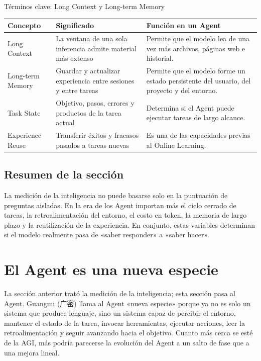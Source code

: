 \documentclass[a4paper]{article}
\begin{document}
\begin{knowledgebox}{Términos clave: Long Context y Long-term Memory}
\noindent\begin{tabularx}{\textwidth}{p{}p{}X}
\toprule
Concepto & Significado & Función en un Agent \\
\midrule
Long Context & La ventana de una sola inferencia admite material más extenso & Permite que el modelo lea de una vez más archivos, páginas web e historial. \\
Long-term Memory & Guardar y actualizar experiencia entre sesiones y entre tareas & Permite que el modelo forme un estado persistente del usuario, del proyecto y del entorno. \\
Task State & Objetivo, pasos, errores y productos de la tarea actual & Determina si el Agent puede ejecutar tareas de largo alcance. \\
Experience Reuse & Transferir éxitos y fracasos pasados a tareas nuevas & Es una de las capacidades previas al Online Learning. \\
\bottomrule
\end{tabularx}
\end{knowledgebox}

\subsection{Resumen de la sección}

La medición de la inteligencia no puede basarse solo en la puntuación de preguntas aisladas. En la era de los Agent importan más el ciclo cerrado de tareas, la retroalimentación del entorno, el costo en token, la memoria de largo plazo y la reutilización de la experiencia. En conjunto, estas variables determinan si el modelo realmente pasa de «saber responder» a «saber hacer».
\section{El Agent es una nueva especie}

La sección anterior trató la medición de la inteligencia; esta sección pasa al Agent. Guangmi (广密) llama al Agent «nueva especie» porque ya no es solo un sistema que produce lenguaje, sino un sistema capaz de percibir el entorno, mantener el estado de la tarea, invocar herramientas, ejecutar acciones, leer la retroalimentación y seguir avanzando hacia el objetivo. Cuanto más cerca se esté de la AGI, más podría parecerse la evolución del Agent a un salto de fase que a una mejora lineal.
\end{document}
